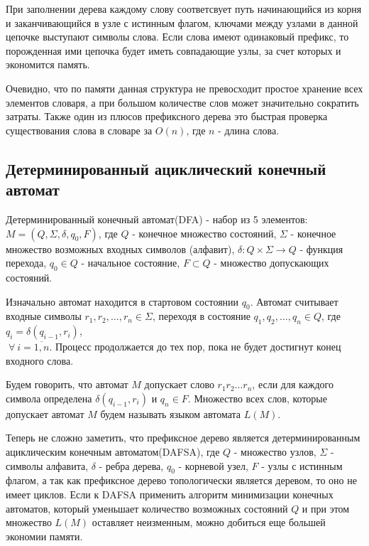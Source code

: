 \documentclass[12pt, a4paper]{article}
\begin{document}
При заполнении дерева каждому слову соответсвует путь начинающийся из корня и заканчивающийся в узле с истинным флагом, ключами между узлами в данной цепочке выступают символы слова. Если слова имеют одинаковый префикс, то порожденная ими цепочка будет иметь совпадающие узлы, за счет которых и экономится память.

\begin{figure}[htp]
\label{ris:Prefix_Trie.png}
\end{figure}

Очевидно, что по памяти данная структура не превосходит простое хранение всех элементов словаря, а при большом количестве слов может значительно сократить затраты. Также один из плюсов префиксного дерева это быстрая проверка существования слова в словаре за $O(n)$, где $n$ - длина слова.

\subsection{Детерминированный ациклический конечный автомат}
\quad Детерминированный конечный автомат(DFA) - набор из 5 элементов: $M = (Q, \Sigma, \delta, q_0, F)$, где $Q$ - конечное множество состояний, $\Sigma$ - конечное множество возможных входных символов (алфавит), $\delta: Q \times \Sigma \longrightarrow Q$ - функция перехода, $q_0 \in Q$ - начальное состояние, $F \subset Q$ - множество допускающих состояний.

Изначально автомат находится в стартовом состоянии $q_0$. Автомат считывает входные символы  
$r_1, r_2, \dots, r_n \in \Sigma$, переходя в состояние $q_1, q_2, \dots, q_n \in Q$, где $q_i = \delta(q_{i-1}, r_i)$, \\ $\; \forall \: i = \overline{1, n}$. Процесс продолжается до тех пор, пока не будет достигнут конец входного слова.

Будем говорить, что автомат $M$ допускает слово $r_1 r_2\dots r_n$, если для каждого символа определена $\delta(q_{i-1}, r_i)$ и $q_n \in F$. Множество всех слов, которые допускает автомат $M$ будем называть языком автомата $L(M)$.

Теперь не сложно заметить, что префиксное дерево является детерминированным ациклическим конечным автоматом(DAFSA), где $Q$ - множество узлов, $\Sigma$ - символы алфавита, $\delta$ - ребра дерева, $q_0$ - корневой узел, $F$ - узлы с истинным флагом, а так как префиксное дерево топологически является деревом, то оно не имеет циклов. Если к DAFSA применить алгоритм минимизации конечных автоматов, который уменьшает количество возможных состояний $Q$ и при этом множество $L(M)$ оставляет неизменным, можно добиться еще большей экономии памяти.
\end{document}
